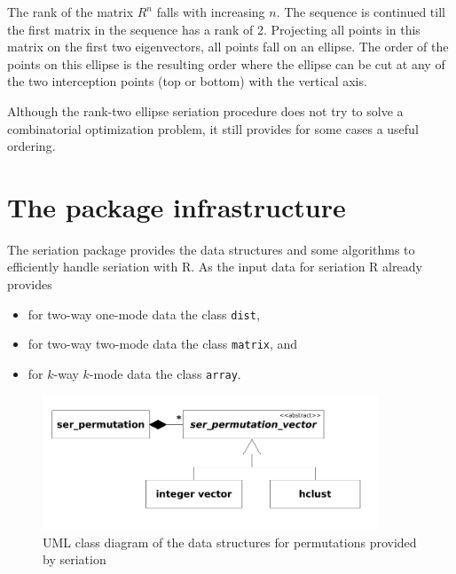 \documentclass[fleqn, a4paper]{article}
\newcommand{\strong}[1]{{\normalfont\fontseries{b}\selectfont #1}}
\newcommand{\code}[1]{\mbox{\texttt{#1}}}
\newcommand{\pkg}[1]{\strong{#1}}
\begin{document}
The rank of the matrix $R^n$ falls with increasing $n$. The sequence
is continued till the first matrix in the sequence has a rank of 2.
Projecting all points in this matrix on the first two eigenvectors,
all points fall on an ellipse. The order of the points on this ellipse
is the resulting order where the ellipse can be cut at any of the 
two interception points (top or bottom) with the vertical axis.

Although the rank-two ellipse seriation procedure does not try to solve a
combinatorial optimization problem, it still provides for some cases a useful
ordering.

\section{The package infrastructure}
\label{sec:infrastructure}

The \pkg{seriation} package provides the data structures and some algorithms
to efficiently handle seriation with R. As the input data for seriation R 
already provides

\begin{itemize}
    \item for two-way one-mode data the class \code{dist},
    \item for two-way two-mode data the class \code{matrix}, and
    \item for $k$-way $k$-mode data the class \code{array}.
\end{itemize}


\begin{figure}[tp]
    \centerline{
    \includegraphics[width=10cm]{classes}}

    \caption{UML class diagram of the data structures for permutations provided by \pkg{seriation}}
    \label{fig:infrastructure}
\end{figure}
\end{document}
